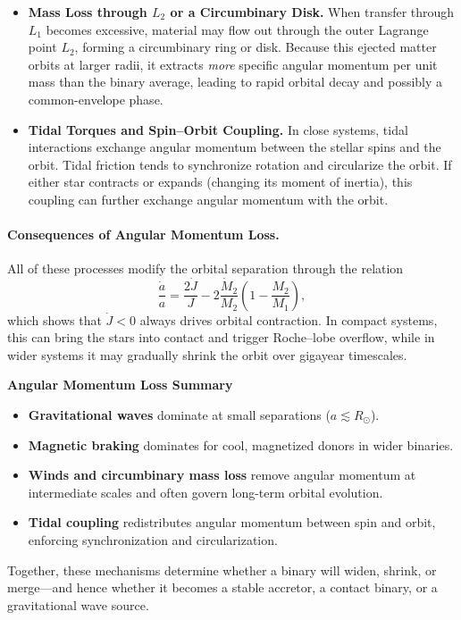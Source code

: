 \begin{itemize}
    \item \textbf{Mass Loss through $L_2$ or a Circumbinary Disk.}  
    When transfer through $L_1$ becomes excessive, material may flow out through the outer Lagrange point $L_2$, forming a circumbinary ring or disk.  
    Because this ejected matter orbits at larger radii, it extracts \emph{more} specific angular momentum per unit mass than the binary average, leading to rapid orbital decay and possibly a common-envelope phase.

    \item \textbf{Tidal Torques and Spin–Orbit Coupling.}  
    In close systems, tidal interactions exchange angular momentum between the stellar spins and the orbit.  
    Tidal friction tends to synchronize rotation and circularize the orbit.  
    If either star contracts or expands (changing its moment of inertia), this coupling can further exchange angular momentum with the orbit.
\end{itemize}

\paragraph{Consequences of Angular Momentum Loss.}
All of these processes modify the orbital separation through the relation
\[
\frac{\dot{a}}{a} = \frac{2\dot{J}}{J}
    - 2\frac{\dot{M}_2}{M_2}\left(1 - \frac{M_2}{M_1}\right),
\]
which shows that $\dot{J}<0$ always drives orbital contraction.  
In compact systems, this can bring the stars into contact and trigger Roche–lobe overflow, while in wider systems it may gradually shrink the orbit over gigayear timescales.

\begin{bigidea}
\textbf{Angular Momentum Loss Summary}
\begin{itemize}
    \item \textbf{Gravitational waves} dominate at small separations ($a \lesssim R_\odot$).
    \item \textbf{Magnetic braking} dominates for cool, magnetized donors in wider binaries.
    \item \textbf{Winds and circumbinary mass loss} remove angular momentum at intermediate scales and often govern long-term orbital evolution.
    \item \textbf{Tidal coupling} redistributes angular momentum between spin and orbit, enforcing synchronization and circularization.
\end{itemize}
Together, these mechanisms determine whether a binary will widen, shrink, or merge—and hence whether it becomes a stable accretor, a contact binary, or a gravitational wave source.
\end{bigidea}


